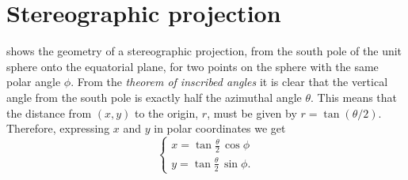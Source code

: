 \documentclass[11pt,a4paper, 
swedish, english %
]{article}
\begin{document}
\section{Stereographic projection}
\swapcommands{\phi}{\varphi}

\begin{figure}\centering
\resizebox{.6\textwidth}{!}{
}
\caption{}
\label{fig:stereographic}
\end{figure}

 shows the geometry of a stereographic
projection, from the south pole of the unit sphere onto the equatorial
plane, for two points on the sphere with the same polar angle
$\phi$. From the \emph{theorem of inscribed angles} it is clear that
the vertical angle from the south pole is exactly half the azimuthal
angle $\theta$. This means that the distance from $(x,y)$ to the
origin, $r$, must be given by $r=\tan(\theta/2)$. Therefore,
expressing $x$ and $y$ in polar coordinates we get
\begin{equation}
\begin{cases}
x=\tan\tfrac{\theta}{2}\,\cos\phi\\
y=\tan\tfrac{\theta}{2}\,\sin\phi.
\end{cases}
\end{equation}
\end{document}
